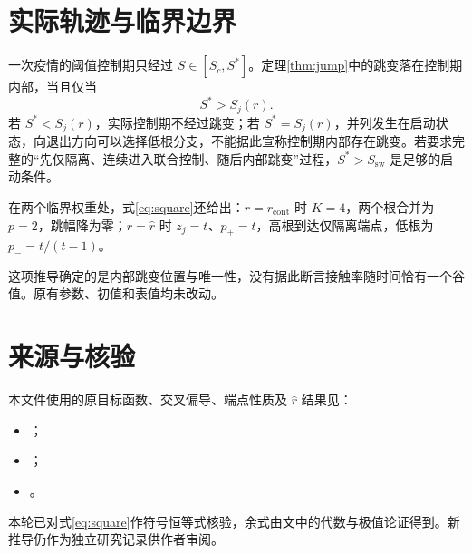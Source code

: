 \documentclass[11pt,a4paper]{ctexart}
\newcommand{\rcont}{r_{\mathrm{cont}}}
\newcommand{\Sj}{S_j}
\newcommand{\Ssw}{S_{\mathrm{sw}}}
\begin{document}
\section{实际轨迹与临界边界}

一次疫情的阈值控制期只经过 $S\in[S_c,S^*]$。定理\ref{thm:jump}中的跳变落在控制期内部，当且仅当
\[
 S^*>\Sj(r).
\]
若 $S^*<\Sj(r)$，实际控制期不经过跳变；若 $S^*=\Sj(r)$，并列发生在启动状态，向退出方向可以选择低根分支，不能据此宣称控制期内部存在跳变。若要求完整的“先仅隔离、连续进入联合控制、随后内部跳变”过程，$S^*>\Ssw$ 是足够的启动条件。

在两个临界权重处，式\eqref{eq:square}还给出：$r=\rcont$ 时 $K=4$，两个根合并为 $p=2$，跳幅降为零；$r=\hat r$ 时 $z_j=t$、$p_+=t$，高根到达仅隔离端点，低根为 $p_-=t/(t-1)$。

这项推导确定的是内部跳变位置与唯一性，没有据此断言接触率随时间恰有一个谷值。原有参数、初值和表值均未改动。

\section*{来源与核验}
本文件使用的原目标函数、交叉偏导、端点性质及 $\hat r$ 结果见：
\begin{itemize}
\item {}；
\item {}；
\item {}。
\end{itemize}
本轮已对式\eqref{eq:square}作符号恒等式核验，余式由文中的代数与极值论证得到。新推导仍作为独立研究记录供作者审阅。
\end{document}
